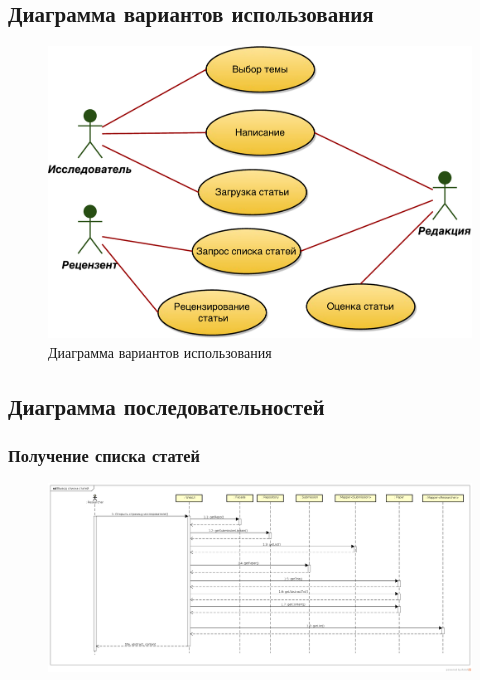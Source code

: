 \subsection{Диаграмма вариантов использования}

\begin{figure}[H]
\centering
\includegraphics[width=\textwidth]{UseCases.pdf}
\caption{Диаграмма вариантов использования}
\end{figure}

\subsection{Диаграмма последовательностей}

\subsubsection{Получение списка статей}

\begin{figure}[H]
\centering
\includegraphics[width=\textwidth]{seq_papers.png}
\caption{}
\end{figure}

